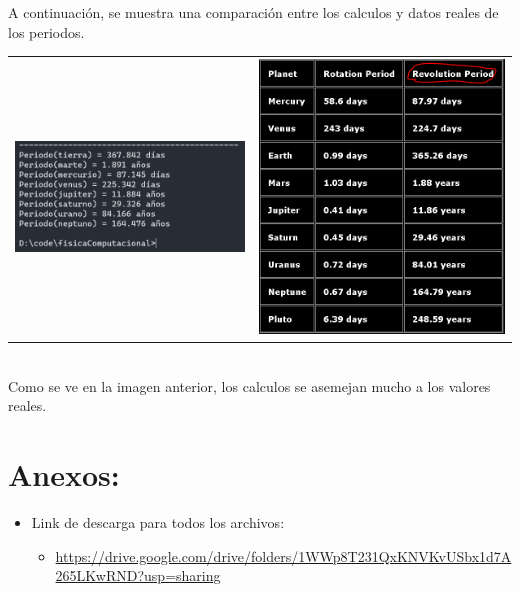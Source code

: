 \documentclass[a4paper,12pt]{article}
\begin{document}
	\newpage
    A continuación, se muestra una comparación entre
    los calculos y datos reales de los periodos.
    \begin{table}[htbp]
        \centering
        \begin{tabular}{cc}
            \begin{minipage}{.43\textwidth}
                \includegraphics[width=\linewidth]{e4_3}
            \end{minipage}&\begin{minipage}{.3\textwidth}
                \includegraphics[width=\linewidth]{e4real}
            \end{minipage}
        \end{tabular}
    \end{table}
    \\
    Como se ve en la imagen anterior, los calculos se asemejan mucho a los valores reales.
    \section{Anexos:}
    \begin{itemize}
        \item Link de descarga para todos los archivos:
        \begin{itemize}
            \item {\footnotesize \url{https://drive.google.com/drive/folders/1WWp8T231QxKNVKvUSbx1d7A265LKwRND?usp=sharing}}
        \end{itemize}
    \end{itemize}
\end{document}
